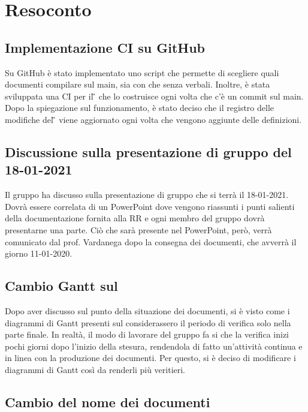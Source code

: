 \newpage


\section{Resoconto}

\subsection{Implementazione CI su GitHub}

Su GitHub è stato implementato uno script che permette di scegliere quali documenti compilare sul main, sia con che senza verbali. Inoltre, è stata sviluppata una CI per il \G{} che lo costruisce ogni volta che c'è un commit sul main. Dopo la spiegazione sul funzionamento, è stato deciso che il registro delle modifiche del \G{} viene aggiornato ogni volta che vengono aggiunte delle definizioni. 

\subsection{Discussione sulla presentazione di gruppo del 18-01-2021}

Il gruppo ha discusso sulla presentazione di gruppo che si terrà il 18-01-2021. Dovrà essere correlata di un PowerPoint dove vengono riassunti i punti salienti della documentazione fornita alla RR e ogni membro del gruppo dovrà presentarne una parte. Ciò che sarà presente nel PowerPoint, però, verrà comunicato dal prof. Vardanega dopo la consegna dei documenti, che avverrà il giorno 11-01-2020.

\subsection{Cambio Gantt sul \PdP{} }

Dopo aver discusso sul punto della situazione dei documenti, si è visto come i diagrammi di Gantt presenti sul \PdP{} considerassero il periodo di verifica solo nella parte finale. In realtà, il modo di lavorare del gruppo fa si che la verifica inizi pochi giorni dopo l'inizio della stesura, rendendola di fatto un'attività continua e in linea con la produzione dei documenti. Per questo, si è deciso di modificare i diagrammi di Gantt così da renderli più veritieri.

\subsection{Cambio del nome dei documenti}

